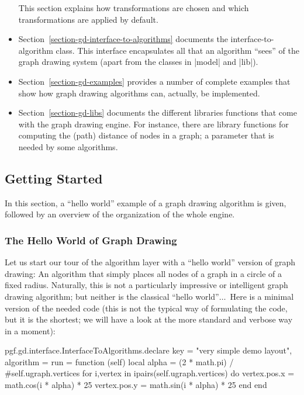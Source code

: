 \begin{itemize}
  This section explains how transformations are chosen and which
  transformations are applied by default.
\item Section~\ref{section-gd-interface-to-algorithms} documents the
  interface-to-algorithm class. This interface encapsulates all that
  an algorithm ``sees'' of the graph drawing system (apart from the
  classes in |model| and |lib|).
\item Section~\ref{section-gd-examples} provides a number of complete
  examples that show how graph drawing algorithms can, actually, be
  implemented. 
\item Section~\ref{section-gd-libs} documents the different
  libraries functions that come with the graph drawing engine. For
  instance, there are library functions for computing the (path)
  distance of nodes in a graph; a parameter that is needed by some
  algorithms.
\end{itemize}



\subsection{Getting Started}

In this section, a ``hello world'' example of a graph
drawing algorithm  is given, followed by an overview of the
organization of the whole engine.


\subsubsection{The Hello World of Graph Drawing}

Let us start our tour of the algorithm layer with a ``hello world''
version of graph drawing: An algorithm that simply places all nodes of
a graph in a circle of a fixed radius. Naturally, this is not a
particularly impressive or intelligent graph drawing algorithm; but
neither is the classical ``hello world''$\dots$\ Here is a minimal
version of the needed code (this is not the typical way of formulating
the code, but it is the shortest; we will have a look at the more
standard and verbose way in a moment):

\begin{codeexample}[code only, tikz syntax=false]
pgf.gd.interface.InterfaceToAlgorithms.declare {
  key = "very simple demo layout",
  algorithm = {
    run =
      function (self)
        local alpha = (2 * math.pi) / #self.ugraph.vertices
        for i,vertex in ipairs(self.ugraph.vertices) do
          vertex.pos.x = math.cos(i * alpha) * 25
          vertex.pos.y = math.sin(i * alpha) * 25
        end
      end
  }
}
\end{codeexample}

